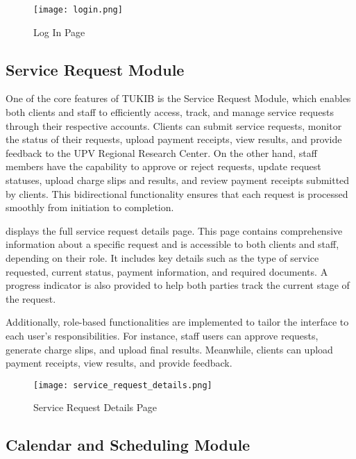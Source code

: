 \begin{figure}[h]
	\centering 
	\texttt{[image: login.png]}
	\caption{Log In Page}
	\label{fig:login}
\end{figure}

\subsection{Service Request Module}

One of the core features of TUKIB is the Service Request Module, which enables both clients and staff to efficiently access, track, and manage service requests through their respective accounts. Clients can submit service requests, monitor the status of their requests, upload payment receipts, view results, and provide feedback to the UPV Regional Research Center. On the other hand, staff members have the capability to approve or reject requests, update request statuses, upload charge slips and results, and review payment receipts submitted by clients. This bidirectional functionality ensures that each request is processed smoothly from initiation to completion.

 displays the full service request details page. This page contains comprehensive information about a specific request and is accessible to both clients and staff, depending on their role. It includes key details such as the type of service requested, current status, payment information, and required documents. A progress indicator is also provided to help both parties track the current stage of the request.

Additionally, role-based functionalities are implemented to tailor the interface to each user's responsibilities. For instance, staff users can approve requests, generate charge slips, and upload final results. Meanwhile, clients can upload payment receipts, view results, and provide feedback.

\begin{figure}[h]
	\centering 
	\texttt{[image: service\_request\_details.png]}
	\caption{Service Request Details Page}
	\label{fig:service_request_details}
\end{figure}

\newpage

\subsection{Calendar and Scheduling Module}

